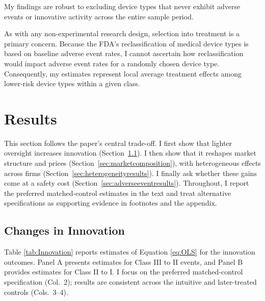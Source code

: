 \documentclass[letterpaper,12pt]{article}
\theoremstyle{definition}
\begin{document}
My findings are robust to excluding device types that never exhibit adverse events or innovative activity across the entire sample period.\footnotemark {}

As with any non-experimental research design, selection into treatment is a primary concern. Because the FDA's reclassification of medical device types is based on baseline adverse event rates, I cannot ascertain how reclassification would impact adverse event rates for a randomly chosen device type.\footnotemark {} Consequently, my estimates represent local average treatment effects among lower-risk device types within a given class.

\section{Results}\label{sec:Results}
 
 This section follows the paper's central trade-off. I first show that lighter oversight increases innovation (Section~\ref{sec:innovationchange}). I then show that it reshapes market structure and prices (Section~\ref{sec:marketcomposition}), with heterogeneous effects across firms (Section~\ref{sec:heterogeneityresults}). I finally ask whether these gains come at a safety cost (Section~\ref{sec:adverseeventresults}). Throughout, I report the preferred matched-control estimates in the text and treat alternative specifications as supporting evidence in footnotes and the appendix.


 \subsection{Changes in Innovation}\label{sec:innovationchange}
 Table \ref{tab:Innovation} reports estimates of Equation \ref{eq:OLS} for the innovation outcomes.\footnotemark {} Panel A presents estimates for Class III to II events, and Panel B provides estimates for Class II to I. I focus on the preferred matched-control specification (Col.~2); results are consistent across the intuitive and later-treated controls (Cols.~3--4).\footnotemark {}
\end{document}

